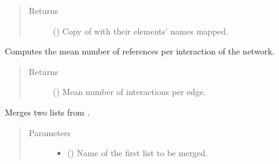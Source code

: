 \documentclass[letterpaper,10pt,english]{sphinxmanual}
\begin{document}
\begin{fulllineitems}
\begin{fulllineitems}
\begin{quote}
\begin{description}
\begin{itemize}
\end{itemize}

\item[{Returns}] \leavevmode
() \textendash{} Copy of  with their elements’ names mapped.

\end{description}\end{quote}

\end{fulllineitems}


\begin{fulllineitems}
\label{\detokenize{reference:pypath.main.PyPath.mean_reference_per_interaction}}
Computes the mean number of references per interaction of the
network.
\begin{quote}\begin{description}
\item[{Returns}] \leavevmode
() \textendash{} Mean number of interactions per edge.

\end{description}\end{quote}

\end{fulllineitems}


\begin{fulllineitems}
\label{\detokenize{reference:pypath.main.PyPath.merge_lists}}
Merges two lists from .
\begin{quote}\begin{description}
\item[{Parameters}] \leavevmode\begin{itemize}
\item {} 
 () \textendash{} Name of the first list to be merged.


\end{itemize}
\end{description}
\end{quote}
\end{fulllineitems}
\end{fulllineitems}
\end{document}

